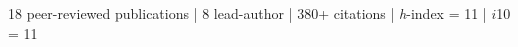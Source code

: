 \documentclass[11pt,a4paper]{article}
\begin{document}

\onehalfspacing


%
\begin{center}
	18 peer-reviewed publications | 8 lead-author | 380+ citations | {\it h}-index = 11 | $i$10 = 11 
\end{center}

\end{document}
